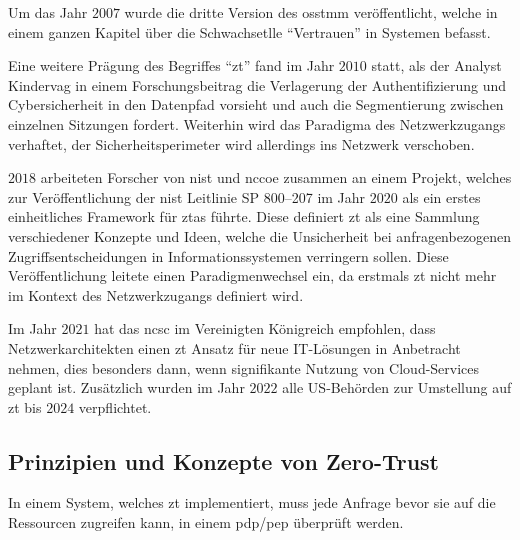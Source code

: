 Um das Jahr $2007$ wurde die dritte Version des \ac{osstmm} veröffentlicht, welche in einem ganzen Kapitel über die Schwachsetlle \enquote{Vertrauen} in Systemen befasst.\autocite[\vglf][]{osstmm-2010}

Eine weitere Prägung des Begriffes \enquote{\ac{zt}} fand im Jahr $2010$ statt, als der Analyst Kindervag in einem Forschungsbeitrag die Verlagerung der Authentifizierung und Cybersicherheit in den Datenpfad vorsieht und auch die Segmentierung zwischen einzelnen Sitzungen fordert.
Weiterhin wird das Paradigma des Netzwerkzugangs verhaftet, der Sicherheitsperimeter wird allerdings ins Netzwerk verschoben.\autocites[\vglf][]{zscaler-2022b}[\vglf][]{kindervag-2010}

$2018$ arbeiteten Forscher von \ac{nist} und \ac{nccoe} zusammen an einem Projekt, welches zur Veröffentlichung der \ac{nist} Leitlinie SP 800--207\autocite{NIST:800207} im Jahr $2020$ als ein erstes einheitliches Framework für \acp{zta} führte.
Diese definiert \ac{zt} als eine Sammlung verschiedener Konzepte und Ideen, welche die Unsicherheit bei anfragenbezogenen Zugriffsentscheidungen in Informationssystemen verringern sollen.
Diese Veröffentlichung leitete einen Paradigmenwechsel ein, da erstmals \ac{zt} nicht mehr im Kontext des Netzwerkzugangs definiert wird.\autocite[\vglf][]{zscaler-2022b}

Im Jahr $2021$ hat das \ac{ncsc} im Vereinigten Königreich empfohlen, dass Netzwerkarchitekten einen \ac{zt} Ansatz für neue IT-Lösungen in Anbetracht nehmen, dies besonders dann, wenn signifikante Nutzung von Cloud-Services geplant ist.\autocite{ncsc-2021}
Zusätzlich wurden im Jahr $2022$ alle US-Behörden zur Umstellung auf \ac{zt} bis $2024$ verpflichtet.\autocite[\vglf][]{zscaler-2022b}


\subsection{Prinzipien und Konzepte von Zero-Trust}\label{subsec:prinzipien-und-konzepte-von-zero-trust}
In einem System, welches \ac{zt} implementiert, muss jede Anfrage bevor sie auf die Ressourcen zugreifen kann, in einem \gls{pdp}/\gls{pep} überprüft werden\autocite[\vglf][]{NIST:800207}.

